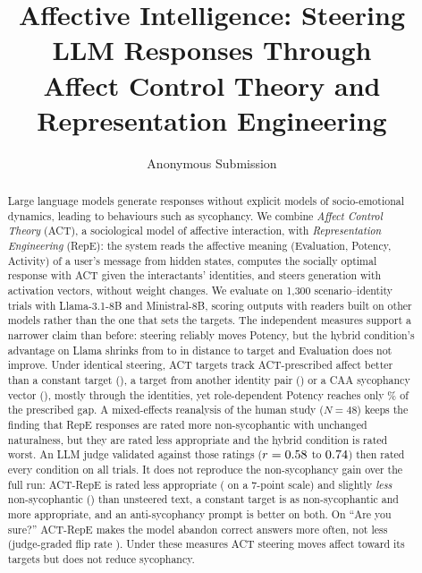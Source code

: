 \documentclass[letterpaper]{article} %
\title{Affective Intelligence: Steering LLM Responses Through\\Affect Control Theory and Representation Engineering}
\author{
    Anonymous Submission
}
\begin{document}
\maketitle


\begin{abstract}
Large language models generate responses without explicit models of socio-emotional dynamics, leading to behaviours such as sycophancy. We combine \textit{Affect Control Theory} (ACT), a sociological model of affective interaction, with \textit{Representation Engineering} (RepE): the system reads the affective meaning (Evaluation, Potency, Activity) of a user's message from hidden states, computes the socially optimal response with ACT given the interactants' identities, and steers generation with activation vectors, without weight changes. We evaluate on 1,300 scenario--identity trials with Llama-3.1-8B and Ministral-8B, scoring outputs with readers built on other models rather than the one that sets the targets. The independent measures support a narrower claim than before: steering reliably moves Potency, but the hybrid condition's advantage on Llama shrinks from \DeltaLlamaOrigHybrid{} to \DeltaLlamaCrossHybrid{} in distance to target and Evaluation does not improve. Under identical steering, ACT targets track ACT-prescribed affect better than a constant target (\AblRepeconstDelta), a target from another identity pair (\AblRepeshuffledDelta) or a CAA sycophancy vector (\AblCaaDelta), mostly through the identities, yet role-dependent Potency reaches only \RoleMCrossRepeonlyFrac\% of the prescribed gap. A mixed-effects reanalysis of the human study ($N = 48$) keeps the finding that RepE responses are rated more non-sycophantic with unchanged naturalness, but they are rated less appropriate and the hybrid condition is rated worst. An LLM judge validated against those ratings ($r = 0.58$ to $0.74$) then rated every condition on all trials. It does not reproduce the non-sycophancy gain over the full run: ACT-RepE is rated less appropriate (\JdLlamaRepeonlyVsUnstA{} on a 7-point scale) and slightly \emph{less} non-sycophantic (\JdLlamaRepeonlyVsUnstC) than unsteered text, a constant target is as non-sycophantic and more appropriate, and an anti-sycophancy prompt is better on both. On ``Are you sure?'' ACT-RepE makes the model abandon correct answers more often, not less (judge-graded flip rate \AysJdRepeactDelta). Under these measures ACT steering moves affect toward its targets but does not reduce sycophancy.
\end{abstract}
\end{document}
